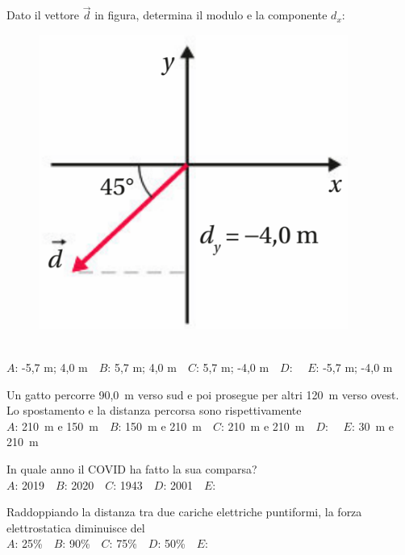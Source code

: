 \mcquestionheader Dato il vettore $\vec{d}$ in figura, determina il modulo e la componente $d_x$: \begin{figure}[h!]   \begin{center}     \includegraphics[scale=0.35]{vettored.png}   \end{center} \end{figure}\\
{$A$}: -5,7 m; 4,0 m\ \ {$B$}: 5,7 m; 4,0 m\ \ {$C$}: 5,7 m; -4,0 m\ \ {$D$}: \ \ {$E$}: -5,7 m; -4,0 m\ \ 

\mcquestionfooter



\def\mcquestionnumber{7}


\mcquestionheader Un gatto percorre 90,0~m verso sud e poi prosegue per altri 120~m verso ovest. Lo spostamento e la distanza percorsa sono rispettivamente\\
{$A$}: 210~m e 150~m\ \ {$B$}: 150~m e 210~m\ \ {$C$}: 210~m e 210~m\ \ {$D$}: \ \ {$E$}: 30~m e 210~m\ \ 

\mcquestionfooter



\def\mcquestionnumber{8}


\mcquestionheader In quale anno il COVID ha fatto la sua comparsa?\\
{$A$}: 2019\ \ {$B$}: 2020\ \ {$C$}: 1943\ \ {$D$}: 2001\ \ {$E$}: \ \ 

\mcquestionfooter



\def\mcquestionnumber{9}


\mcquestionheader Raddoppiando la distanza tra due cariche elettriche puntiformi, la forza elettrostatica diminuisce del\\
{$A$}: 25\%\ \ {$B$}: 90\%\ \ {$C$}: 75\%\ \ {$D$}: 50\%\ \ {$E$}: \ \ 


